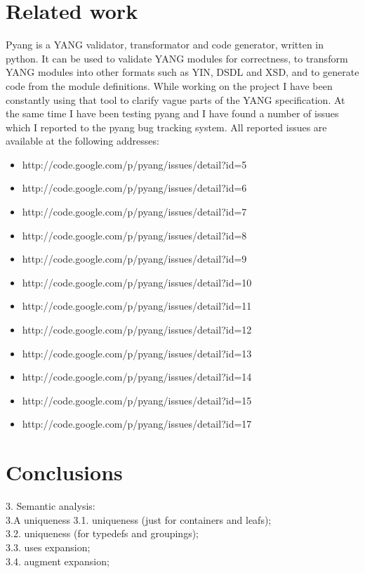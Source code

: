 \documentclass[conference]{IEEEtran}
\begin{document}
\section{Related work}
Pyang \cite{bib8} is a YANG validator, transformator and code generator, written in python. It can be used to validate YANG modules for correctness, to transform YANG modules into other formats such as YIN, DSDL and XSD, and to generate code from the module definitions. While working on the project I have been constantly using that tool to clarify vague parts of the YANG specification. At the same time I have been testing pyang and I have found a number of issues which I reported to the pyang bug tracking system. All reported issues are available at the following addresses:
\begin{itemize}
\item http://code.google.com/p/pyang/issues/detail?id=5
\item http://code.google.com/p/pyang/issues/detail?id=6
\item http://code.google.com/p/pyang/issues/detail?id=7
\item http://code.google.com/p/pyang/issues/detail?id=8
\item http://code.google.com/p/pyang/issues/detail?id=9
\item http://code.google.com/p/pyang/issues/detail?id=10
\item http://code.google.com/p/pyang/issues/detail?id=11
\item http://code.google.com/p/pyang/issues/detail?id=12
\item http://code.google.com/p/pyang/issues/detail?id=13
\item http://code.google.com/p/pyang/issues/detail?id=14
\item http://code.google.com/p/pyang/issues/detail?id=15
\item http://code.google.com/p/pyang/issues/detail?id=17
\end{itemize}

\section{Conclusions}
3. Semantic analysis:\\
  3.A uniqueness
	3.1. uniqueness (just for containers and leafs);\\
	3.2. uniqueness (for typedefs and groupings);\\
	3.3. uses expansion;\\
	3.4. augment expansion;\\
\end{document}
